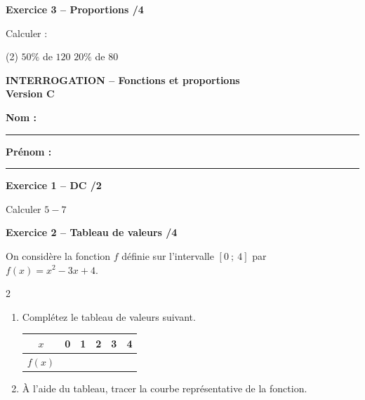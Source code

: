\documentclass[10pt,a4paper]{article}
\newcommand{\version}[1]{
    \begin{center}
        \textbf{\large INTERROGATION -- Fonctions et proportions}\\
        \textbf{Version #1}
    \end{center}

    \vspace{-0.1cm}

    \textbf{Nom :} \rule{5cm}{0.4pt}
    \hfill
    \textbf{Prénom :} \rule{4cm}{0.4pt}

    \vspace{0.2cm}
}
\begin{document}
\textbf{Exercice 3 -- Proportions \hfill /4}

Calculer :\begin{tasks}(2)
\task $50\%$ de $120$
\task $20\%$ de $80$
\end{tasks}

\newpage


\version{C}
\textbf{Exercice 1 -- DC \hfill /2}

Calculer $5-7$

\vspace{0.1cm}

\textbf{Exercice 2 -- Tableau de valeurs \hfill /4}

On considère la fonction \(f\) définie sur l'intervalle \([0\ ;\ 4]\) par \(f(x)=x^2-3x+4\). 


\begin{multicols}{2}
    \begin{minipage}{0.45\textwidth}
    \begin{enumerate}
    \item Complétez le tableau de valeurs suivant.
    
    \begin{center}
        \renewcommand{\arraystretch}{1.5} %
        \setlength{\tabcolsep}{0.3cm} %
        \begin{tabular}{|*{6}{c|}}
        \hline
        \(x\) & 0 & 1 & 2 & 3 & 4  \\
        \hline
        \(f(x)\) &  &  &  &  &  \\
        \hline
        \end{tabular}
    \end{center}

    \vfill\null
    
    \item À l'aide du tableau, tracer la courbe représentative de la fonction.
    \end{enumerate}
    \end{minipage}

        \hspace{-1cm}

\end{multicols}
\end{document}

